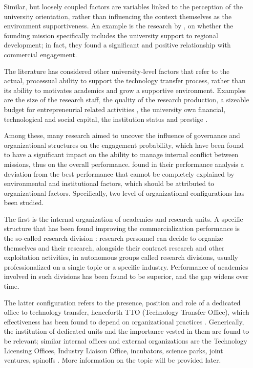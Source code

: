 Similar, but loosely coupled factors are variables linked to the perception of the university orientation, rather than influencing the context themselves as the environment supportiveness. An example is the research by \citet{DEste2007}, on whether the founding mission specifically includes the university support to regional development; in fact, they found a significant and positive relationship with commercial engagement.

The literature has considered other university-level factors that refer to the actual, processual ability to support the technology transfer process, rather than its ability to motivates academics and grow a supportive environment. Examples are the size of the research staff, the quality of the research production, a sizeable budget for entrepreneurial related activities \citep{Colombo2010}, the university own financial, technological and social capital, the institution status and prestige \citep{Guerrero2014}.

Among these, many research aimed to uncover the influence of governance and organizational structures on the engagement probability, which have been found to have a significant impact on the ability to manage internal conflict between missions, thus on the overall performance. \citet{Siegel2003a} found in their performance analysis a deviation from the best performance that cannot be completely explained by environmental and institutional factors, which should be attributed to organizational factors. Specifically, two level of organizational configurations has been studied.

The first is the internal organization of academics and research units. A specific structure that has been found improving the commercialization performance is the so-called research division \citep{VanLooy2004}: research personnel can decide to organize themselves and their research, alongside their contract research and other exploitation activities, in autonomous groups called research divisions, usually professionalized on a single topic or a specific industry. Performance of academics involved in such divisions has been found to be superior, and the gap widens over time.

The latter configuration refers to the presence, position and role of a dedicated office to technology transfer, henceforth TTO (Technology Transfer Office), which effectiveness has been found to depend on organizational practices \citep{Siegel2003a}. Generically, the institution of dedicated units and the importance vested in them are found to be relevant; similar internal offices and external organizations are the Technology Licensing Offices, Industry Liaison Office, incubators, science parks, joint ventures, spinoffs \citep{Tijssen2006}. More information on the topic will be provided later.

